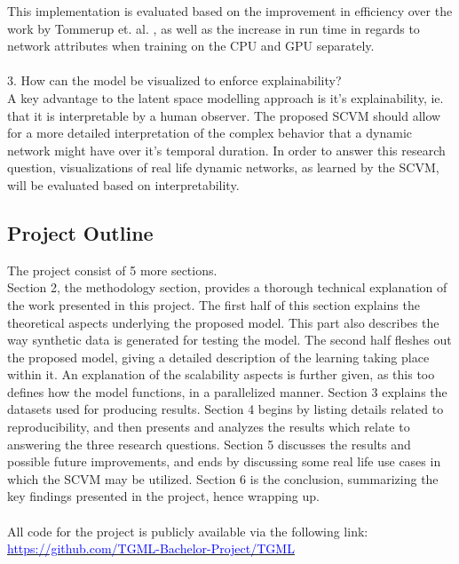 This implementation is evaluated based on the improvement in efficiency over the work by Tommerup et. al. \cite{Tommerup2021LearningNetworks}, as well as the increase in run time in regards to network attributes when training on the CPU and GPU separately.
\\\\
3. How can the model be visualized to enforce explainability?
\\
A key advantage to the latent space modelling approach is it's explainability, ie. that it is interpretable by a human observer.
The proposed SCVM should allow for a more detailed interpretation of the complex behavior that a dynamic network might have over it's temporal duration.
In order to answer this research question, visualizations of real life dynamic networks, as learned by the SCVM, will be evaluated based on interpretability. 



\subsection{Project Outline}
\label{sec:Intro:ThesisOutline}
The project consist of 5 more sections.
\\
Section 2, the methodology section, provides a thorough technical explanation of the work presented in this project.
The first half of this section explains the theoretical aspects underlying the proposed model.
This part also describes the way synthetic data is generated for testing the model.
The second half fleshes out the proposed model, giving a detailed description of the learning taking place within it.
An explanation of the scalability aspects is further given, as this too defines how the model functions, in a parallelized manner.
Section 3 explains the datasets used for producing results.
Section 4 begins by listing details related to reproducibility, and then presents and analyzes the results which relate to answering the three research questions.
Section 5 discusses the results and possible future improvements, and ends by discussing some real life use cases in which the SCVM may be utilized.
Section 6 is the conclusion, summarizing the key findings presented in the project, hence wrapping up.
\\\\
All code for the project is publicly available via the following link:
\\
\href{https://github.com/TGML-Bachelor-Project/TGML}{\textcolor{blue}{https://github.com/TGML-Bachelor-Project/TGML}}






